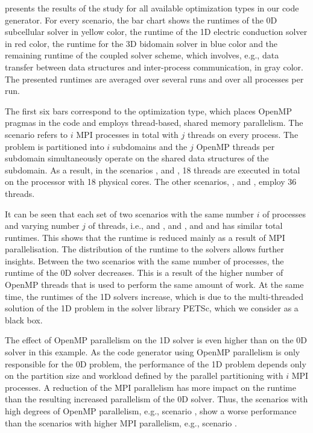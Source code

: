  presents the results of the study for all available optimization types in our code generator. For every scenario, the bar chart shows the runtimes of the 0D subcellular solver in yellow color, the runtime of the 1D electric conduction solver in red color, the runtime for the 3D bidomain solver in blue color and the remaining runtime of the coupled solver scheme, which involves, e.g., data transfer between data structures and inter-process communication, in gray color.
The presented runtimes are averaged over several runs and over all processes per run.

The first six bars correspond to the  optimization type, which places OpenMP pragmas in the code and employs thread-based, shared memory parallelism. The scenario  refers to $i$ MPI processes in total with $j$ threads on every process. The problem is partitioned into $i$ subdomains and the $j$ OpenMP threads per subdomain simultaneously operate on the shared data structures of the subdomain.
As a result, in the scenarios ,  and , 18 threads are executed in total on the processor with 18 physical cores. The other scenarios, ,  and , employ 36 threads.

It can be seen that each set of two scenarios with the same number $i$ of processes and varying number $j$ of threads, i.e.,  and ,  and , and  and  has similar total runtimes. This shows that the runtime is reduced mainly as a result of MPI parallelisation. The distribution of the runtime to the solvers allows further insights. Between the two scenarios with the same number of processes, the runtime of the 0D solver decreases. This is a result of the higher number of OpenMP threads that is used to perform the same amount of work. At the same time, the runtimes of the 1D solvers increase, which is due to the multi-threaded solution of the 1D problem in the solver library PETSc, which we consider as a black box.

The effect of OpenMP parallelism on the 1D solver is even higher than on the 0D solver in this example. As the code generator using OpenMP parallelism is only responsible for the 0D problem, the performance of the 1D problem depends only on the partition size and workload defined by the parallel partitioning with $i$ MPI processes. A reduction of the MPI parallelism has more impact on the runtime than the resulting increased parallelism of the 0D solver. Thus, the scenarios with high degrees of OpenMP parallelism, e.g., scenario , show a worse performance than the scenarios with higher MPI parallelism, e.g., scenario .


